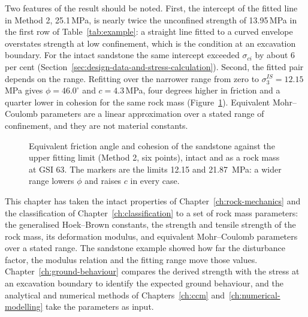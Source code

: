 Two features of the result should be noted. First, the intercept of the fitted
line in Method 2, 25.1\,MPa, is nearly twice the unconfined strength of
13.95\,MPa in the first row of Table~\ref{tab:example}: a straight line fitted to a
curved envelope overstates strength at low confinement, which is the
condition at an excavation boundary. For the intact sandstone the same
intercept exceeded \(\sigma_{ci}\) by about 6 per cent
(Section~\ref{sec:design-data-and-stress-calculation}). Second, the fitted pair depends on the range.
Refitting over the narrower range from zero to \(\sigma_3^{IS} = 12.15\)\,MPa
gives \(\phi = 46.0^\circ\) and \(c = 4.3\)\,MPa, four degrees higher in
friction and a quarter lower in cohesion for the same rock mass
(Figure~\ref{fig:fitting-range-sandstone}). Equivalent
Mohr--Coulomb parameters are a linear approximation over a stated range of
confinement, and they are not material constants.

\begin{figure}[htbp]
\centering
{}
\caption{Equivalent friction angle and cohesion of the sandstone against the upper fitting limit (Method 2, six points), intact and as a rock mass at GSI 63. The markers are the limits 12.15 and 21.87~MPa: a wider range lowers $\phi$ and raises $c$ in every case.}
\label{fig:fitting-range-sandstone}
\end{figure}

This chapter has taken the intact properties of
Chapter~\ref{ch:rock-mechanics} and the classification of
Chapter~\ref{ch:classification} to a set of rock mass parameters: the
generalised Hoek--Brown constants, the strength and tensile strength of the
rock mass, its deformation modulus, and equivalent Mohr--Coulomb parameters
over a stated range. The sandstone example showed how far the disturbance
factor, the modulus relation and the fitting range move those values.
Chapter~\ref{ch:ground-behaviour} compares the derived strength with the
stress at an excavation boundary to identify the expected ground behaviour,
and the analytical and numerical methods of Chapters~\ref{ch:ccm}
and~\ref{ch:numerical-modelling} take the parameters as input.

\chapterreferences
